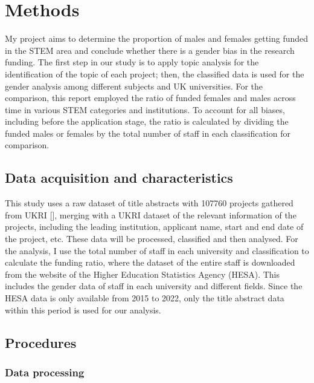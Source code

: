 \section{Methods}

My project aims to determine the proportion of males and females getting funded in the STEM area and conclude whether there is a gender bias in the research funding. The first step in our study is to apply topic analysis for the identification of the topic of each project; then, the classified data is used for the gender analysis among different subjects and UK universities. For the comparison, this report employed the ratio of funded females and males across time in various STEM categories and institutions. To account for all biases, including before the application stage, the ratio is calculated by dividing the funded males or females by the total number of staff in each classification for comparison. 

\subsection{Data acquisition and characteristics}

This study uses a raw dataset of title abstracts with 107760 projects gathered from UKRI [\cite{Flavia}], merging with a UKRI dataset of the relevant information of the projects, including the leading institution, applicant name, start and end date of the project, etc. These data will be processed, classified and then analysed. For the analysis, I use the total number of staff in each university and classification to calculate the funding ratio, where the dataset of the entire staff is downloaded from the website of the Higher Education Statistics Agency (HESA). This includes the gender data of staff in each university and different fields. Since the HESA data is only available from 2015 to 2022, only the title abstract data within this period is used for our analysis.

\subsection{Procedures}

\subsubsection{Data processing}


